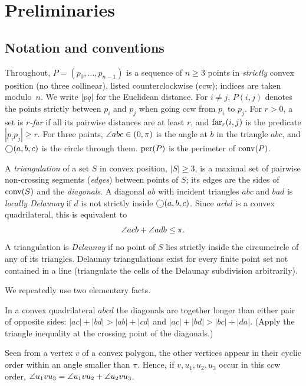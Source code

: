 \chapter{Preliminaries}\label{ch:prelim}
\section{Notation and conventions}\label{sec:prelim}

Throughout, $P=(p_0,\dots,p_{n-1})$ is a sequence of $n\ge3$ points in
\emph{strictly} convex position (no three collinear), listed counterclockwise
(ccw); indices are taken modulo~$n$. We write $|pq|$ for the Euclidean
distance. For $i\ne j$, $P(i,j)$ denotes the points strictly between $p_i$ and
$p_j$ when going ccw from $p_i$ to $p_j$. For $r>0$, a set is \emph{$r$-far}
if all its pairwise distances are at least $r$, and $\mathrm{far}_r(i,j)$ is the
predicate $|p_ip_j|\ge r$. For three points, $\angle abc\in(0,\pi)$ is the angle
at $b$ in the triangle $abc$, and $\bigcirc(a,b,c)$ is the circle through
them. $\mathrm{per}(P)$ is the perimeter of $\mathrm{conv}(P)$.

A \emph{triangulation} of a set $S$ in convex position, $|S|\ge3$, is a
maximal set of pairwise non-crossing segments (\emph{edges}) between points of
$S$; its edges are the sides of $\mathrm{conv}(S)$ and the \emph{diagonals}. A
diagonal $ab$ with incident triangles $abc$ and $bad$ is \emph{locally
Delaunay} if $d$ is not strictly inside $\bigcirc(a,b,c)$. Since $acbd$ is a
convex quadrilateral, this is equivalent to
\begin{equation}\label{eq:ld}
\angle acb+\angle adb\le\pi .
\end{equation}
A triangulation is \emph{Delaunay} if no point of $S$ lies strictly inside the
circumcircle of any of its triangles. Delaunay triangulations exist for every
finite point set not contained in a line (triangulate the cells of the
Delaunay subdivision arbitrarily).

We repeatedly use two elementary facts.
\begin{description}[leftmargin=1.5em,itemsep=1pt]
\item[(Q)] In a convex quadrilateral $abcd$ the diagonals are together longer
than either pair of opposite sides: $|ac|+|bd|>|ab|+|cd|$ and
$|ac|+|bd|>|bc|+|da|$. (Apply the triangle inequality at the crossing point of
the diagonals.)
\item[(A)] Seen from a vertex $v$ of a convex polygon, the other vertices
appear in their cyclic order within an angle smaller than $\pi$. Hence, if
$v,u_1,u_2,u_3$ occur in this ccw order, $\angle u_1vu_3=\angle u_1vu_2+\angle u_2vu_3$.
\end{description}

